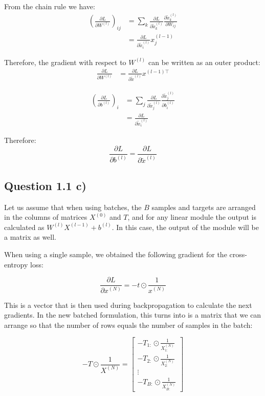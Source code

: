 \documentclass{article}
\begin{document}
From the chain rule we have:
\begin{align}
\left(\frac{\partial L}{\partial W^{(l)}}\right)_{ij} &= \sum_k\frac{\partial L}{\partial \tilde{x}^{(l)}_k}\frac{\partial \tilde{x}^{(l)}_k}{\partial W_{ij}}\\
&= \frac{\partial L}{\partial \tilde{x}^{(l)}_i}x^{(l-1)}_j
\end{align}

Therefore, the gradient with respect to $W^{(l)}$ can be written as an outer product:
\begin{align}
\frac{\partial L}{\partial W^{(l)}} &= \frac{\partial L}{\partial\tilde{x}^{(l)}}x^{(l-1)\top}
\end{align}

\begin{align}
\left(\frac{\partial L}{\partial b^{(l)}}\right)_i &= \sum_j \frac{\partial L}{\partial\tilde{x}^{(l)}_j} \frac{\partial\tilde{x}^{(l)}_j}{\partial b^{(l)}_i}\\
&=
\frac{\partial L}{\partial\tilde{x}^{(l)}_i}
\end{align}

Therefore:
\begin{equation}
\frac{\partial L}{\partial b^{(l)}} = \frac{\partial L}{\partial\tilde{x}^{(l)}}
\end{equation}

\subsection*{Question 1.1 c)}

Let us assume that when using batches, the $B$ samples and targets are arranged in the columns of matrices $X^{(0)}$ and $T$, and for any linear module the output is calculated as $W^{(l)}X^{(l-1)} + b^{(l)}$. In this case, the output of the module will be a matrix as well.

When using a single sample, we obtained the following gradient for the cross-entropy loss:

\begin{equation*}
\frac{\partial L}{\partial x^{(N)}} = -t\odot\frac{1}{x^{(N)}}
\end{equation*}

This is a vector that is then used during backpropagation to calculate the next gradients. In the new batched formulation, this turns into is a matrix that we can arrange so that the number of rows equals the number of samples in the batch:

\begin{equation}
-T\odot \frac{1}{X^{(N)}} = 
\begin{bmatrix}
-T_{1:}\odot\frac{1}{X^{(N)}_{1:}}\\
-T_{2:}\odot\frac{1}{X^{(N)}_{2:}}\\
\vdots\\
-T_{B:}\odot\frac{1}{X^{(N)}_{B:}}
\end{bmatrix}
\end{equation}
\end{document}
